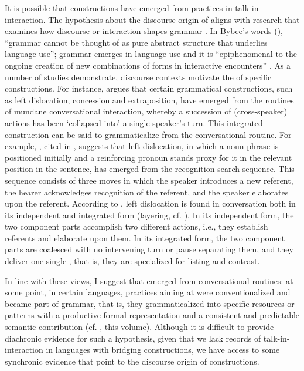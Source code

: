 \documentclass[output=paper]{LSP/langsci}
\begin{document}
It is possible that  constructions have emerged from  practices in talk-in-interaction. The hypothesis about the discourse origin of  aligns with research that examines how discourse or interaction shapes grammar \citep{givon79,hopper80,ochs96,Selting01}. In Bybee’s words (\citeyear[][730]{bybee.2006}), ``grammar cannot be thought of as pure abstract structure that underlies language use''; grammar emerges in language use and it is ``epiphenomenal to the ongoing creation of new combinations of forms in interactive encounters'' \citep[][26]{hopper11}. As a number of studies \citep{couper11,gipper11,blythe.2013} demonstrate, discourse contexts motivate the  of specific constructions. For instance, \citet{couper11} argues that certain grammatical constructions, such as left dislocation, concession and extraposition, have emerged from the  routines of mundane conversational interaction, whereby a succession of (cross-speaker) actions has been `collapsed into' a single speaker’s turn. This integrated construction can be said to grammaticalize from the conversational routine. For example, \citet{geluykens92}, cited in \citet{couper11}, suggests that left dislocation, in which a noun phrase is positioned initially and a reinforcing pronoun stands proxy for it in the relevant position in the sentence, has emerged from the recognition search sequence. This sequence consists of three moves in which the speaker introduces a new referent, the hearer acknowledges recognition of the referent, and the speaker elaborates upon the referent. According to \citet[][429]{couper11}, left dislocation is found in  conversation both in its independent and integrated form (layering, cf. \citealt{hopper91}). In its independent form, the two component parts accomplish two different actions, i.e., they establish referents and elaborate upon them. In its integrated form, the two component parts are coalesced with no intervening turn or pause separating them, and they deliver one single , that is, they are specialized for listing and contrast. 

In line with these views, I suggest that  emerged from conversational routines: at some point, in certain languages,  practices aiming at  were conventionalized and became part of grammar, that is, they grammaticalized into specific resources or patterns with a productive formal representation and a consistent and predictable semantic contribution (cf. \citealt{guerin18}, this volume). Although it is difficult to provide diachronic evidence for such a hypothesis, given that we lack records of talk-in-interaction in languages with bridging constructions, we have access to some synchronic evidence that point to the discourse origin of  constructions. 
\end{document}
